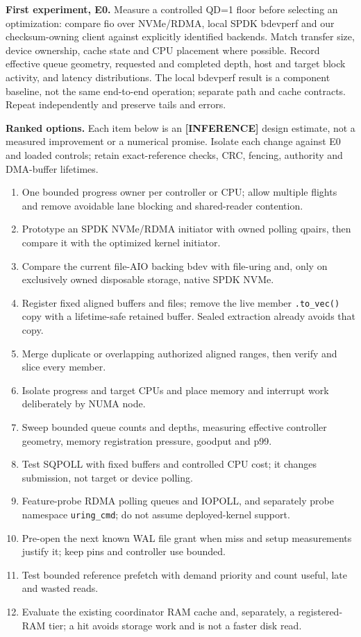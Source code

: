 \documentclass[10pt,a4paper]{article}
\begin{document}
\textbf{First experiment, E0.} Measure a controlled QD=1 floor before selecting an optimization: compare fio over NVMe/RDMA, local SPDK bdevperf and our checksum-owning client against explicitly identified backends. Match transfer size, device ownership, cache state and CPU placement where possible. Record effective queue geometry, requested and completed depth, host and target block activity, and latency distributions. The local bdevperf result is a component baseline, not the same end-to-end operation; separate path and cache contracts. Repeat independently and preserve tails and errors.

\textbf{Ranked options.} Each item below is an \textbf{[INFERENCE]} design estimate, not a measured improvement or a numerical promise. Isolate each change against E0 and loaded controls; retain exact-reference checks, CRC, fencing, authority and DMA-buffer lifetimes.
\begin{enumerate}\setlength{\itemsep}{1pt}\setlength{\parskip}{0pt}
\item One bounded progress owner per controller or CPU; allow multiple flights and remove avoidable lane blocking and shared-reader contention.
\item Prototype an SPDK NVMe/RDMA initiator with owned polling qpairs, then compare it with the optimized kernel initiator.
\item Compare the current file-AIO backing bdev with file-uring and, only on exclusively owned disposable storage, native SPDK NVMe.
\item Register fixed aligned buffers and files; remove the live member \texttt{.to\_vec()} copy with a lifetime-safe retained buffer. Sealed extraction already avoids that copy.
\item Merge duplicate or overlapping authorized aligned ranges, then verify and slice every member.
\item Isolate progress and target CPUs and place memory and interrupt work deliberately by NUMA node.
\item Sweep bounded queue counts and depths, measuring effective controller geometry, memory registration pressure, goodput and p99.
\item Test SQPOLL with fixed buffers and controlled CPU cost; it changes submission, not target or device polling.
\item Feature-probe RDMA polling queues and IOPOLL, and separately probe namespace \texttt{uring\_cmd}; do not assume deployed-kernel support.
\item Pre-open the next known WAL file grant when miss and setup measurements justify it; keep pins and controller use bounded.
\item Test bounded reference prefetch with demand priority and count useful, late and wasted reads.
\item Evaluate the existing coordinator RAM cache and, separately, a registered-RAM tier; a hit avoids storage work and is not a faster disk read.
\end{enumerate}
\end{document}
